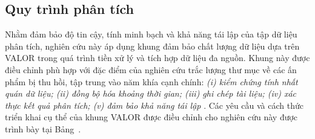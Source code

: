 \subsection{Quy trình phân tích}

Nhằm đảm bảo độ tin cậy, tính minh bạch và khả năng tái lập của tập dữ liệu phân tích, nghiên cứu này áp dụng khung đảm bảo chất lượng dữ liệu dựa trên VALOR trong quá trình tiền xử lý và tích hợp dữ liệu đa nguồn. Khung này được điều chỉnh phù hợp với đặc điểm của nghiên cứu trắc lượng thư mục về các ấn phẩm bị thu hồi, tập trung vào năm khía cạnh chính: \textit{(i) kiểm chứng tính nhất quán dữ liệu; (ii) đồng bộ hóa khoảng thời gian; (iii) ghi chép tài liệu; (iv) xác thực kết quả phân tích; (v) đảm bảo khả năng tái lập} \parencite{hoang2025}. Các yêu cầu và cách thức triển khai cụ thể của khung VALOR được điều chỉnh cho nghiên cứu này được trình bày tại Bảng~.

